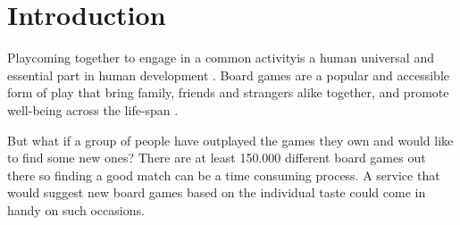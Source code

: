\documentclass[a4paper,12pt,bibliography=totoc,numbers=noenddot,sfdefaults=false,abstract=true,notitlepage]{scrartcl} %
\begin{document}
	
	
	\begin{singlespace}
		\maketitle %
		
		\begin{abstract}
			{\parindent0pt %
				
				\blindtext
				
			}%
		\end{abstract} \hspace{10pt}
		
	\end{singlespace}

	\newpage
	
	
	\section{Introduction}\label{intro}
	
	Play\textemdash coming together to engage in a common activity\textemdash is a human universal \autocite{brownHumanUniversalsHuman2004} and essential part in human development \autocite{smithPlayTypesFunctions2005,pellegriniRolePlayHuman2009}. Board games are a popular and accessible form of play that bring family, friends and strangers alike together, and promote well-being across the life-span \autocite{dellangelaBoardGamesEmotional2020,solway2011wellness}.

	But what if a group of people have outplayed the games they own and would like to find some new ones? There are at least 150.000 different board games out there \autocite{wordsratedBoardGamesStatistics2025} so finding a good match can be a time consuming process. A service that would suggest new board games based on the individual taste could come in handy on such occasions.
	
\end{document}
